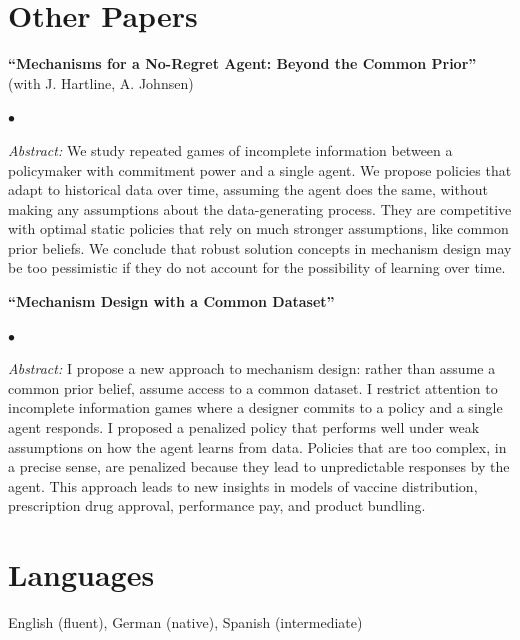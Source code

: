\documentclass[margin,line]{res}
\newenvironment{list1}{
  \begin{list}{\ding{113}}{%
      \setlength{\itemsep}{.025in}
      \setlength{\parsep}{0in} \setlength{\parskip}{0in}
      \setlength{\topsep}{0in} \setlength{\partopsep}{0in}
      \setlength{\leftmargin}{0.17in}}}{\end{list}}
\newenvironment{list2}{
  \begin{list}{$\bullet$}{%
      \setlength{\itemsep}{0in}
      \setlength{\parsep}{0in} \setlength{\parskip}{0in}
      \setlength{\topsep}{0in} \setlength{\partopsep}{0in}
      \setlength{\leftmargin}{0.2in}}}{\end{list}}
\begin{document}
\begin{resume}
\section{Other Papers}
\begin{list1}
\item[] \textbf{``Mechanisms for a No-Regret Agent: Beyond the Common Prior''} (with  J. Hartline, A. Johnsen)
\vspace*{.05in}
	\begin{list2}
		\item[] \textit{Abstract:} We study repeated games of incomplete information between a policymaker with commitment power and a single agent.
		We propose policies that adapt to historical data over time, assuming the agent does the same, without making any assumptions about the data-generating process.
		They are competitive with optimal static policies that rely on much stronger assumptions, like common prior beliefs.
		We conclude that robust solution concepts in mechanism design may be too pessimistic if they do not account for the possibility of learning over time.
	\end{list2}
\end{list1}
\vspace*{.1in}
\begin{list1}
	\item[] \textbf{``Mechanism Design with a Common Dataset''}
\vspace*{.05in}
	\begin{list2}
		\item[] \textit{Abstract:} 
		I propose a new approach to mechanism design: rather than assume a common prior belief, assume access to a common dataset.
		I restrict attention to incomplete information games where a designer commits to a policy and a single agent responds.
		I proposed a penalized policy that performs well under weak assumptions on how the agent learns from data.
		Policies that are too complex, in a precise sense, are penalized because they lead to unpredictable responses by the agent.
		This approach leads to new insights in models of vaccine distribution, prescription drug approval, performance pay, and product bundling.
	\end{list2}
\end{list1}

\section{Languages}
\begin{list1}
\item[] English (fluent), German (native), Spanish (intermediate)
\end{list1}


\end{resume}
\end{document}
